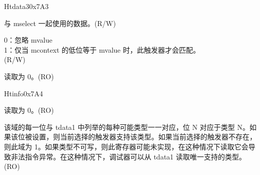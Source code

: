 \begin{register}{H}{tdata3}{0x7A3}\label{regdesc:TDATA3}
%
%
%
\regnewline%
\begin{regdesc}\begin{reglist}
\label{fielddesc:MVALUE}\item [mvalue] 与 mselect 一起使用的数据。(R/W)
\label{fielddesc:MSELECT}\item [mselect]
0：忽略 mvalue\\
1：仅当 mcontext 的低位等于 mvalue 时，此触发器才会匹配。\\
(R/W)
\label{fielddesc:tdata3_rsvd}\item [Reserved] 读取为 0。(RO)
\end{reglist}\end{regdesc}
\end{register}

\begin{register}{H}{tinfo}{0x7A4}\label{regdesc:TINFO}
%
%
\regnewline%
\begin{regdesc}\begin{reglist}
\label{fielddesc:tinfo_rsvd}\item [Reserved] 读取为 0。(RO)
\label{fielddesc:INFO}\item [info] 该域的每一位与 tdata1 中列举的每种可能类型一一对应，位 N 对应于类型 N。如果该位被设置，则当前选择的触发器支持该类型。如果当前选择的触发器不存在，则此域为 1。如果类型不可写，则此寄存器可能未实现，在这种情况下读取它会导致非法指令异常。在这种情况下，调试器可以从 tdata1 读取唯一支持的类型。(RO)
\end{reglist}\end{regdesc}
\end{register}

